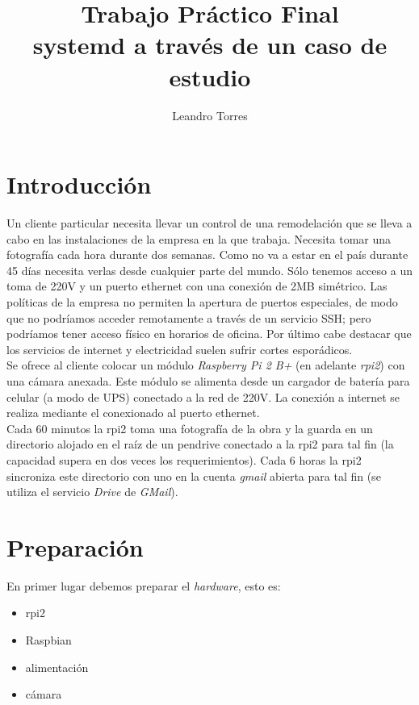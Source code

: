 \documentclass[10pt,a4paper]{article}
\author{Leandro Torres}
\title{\Huge{Trabajo Pr\'actico Final}\\
	\vspace{5cm}
	\huge{systemd a trav\'es de un caso de estudio}}
\begin{document}
\maketitle
\pagebreak
\tableofcontents

\section{Introducci\'on}

Un cliente particular necesita llevar un control de una remodelaci\'on que se lleva a cabo en las instalaciones de la empresa en la que trabaja. Necesita tomar una fotograf\'ia cada hora durante dos semanas. Como no va a estar en el pa\'is durante 45 d\'ias necesita verlas desde cualquier parte del mundo. S\'olo tenemos acceso a un toma de 220V y un puerto ethernet con una conexi\'on de 2MB sim\'etrico. Las pol\'iticas de la empresa no permiten la apertura de puertos especiales, de modo que no podr\'iamos acceder remotamente a trav\'es de un servicio SSH; pero podr\'iamos tener acceso f\'isico en horarios de oficina. Por \'ultimo cabe destacar que los servicios de internet y electricidad suelen sufrir cortes espor\'adicos.\\

Se ofrece al cliente colocar un m\'odulo \emph{Raspberry Pi 2 B+} (en adelante \emph{rpi2}) con una c\'amara anexada. Este m\'odulo se alimenta desde un cargador de bater\'ia para celular (a modo de UPS) conectado a la red de 220V. La conexi\'on a internet se realiza mediante el conexionado al puerto ethernet.\\

Cada 60 minutos la rpi2 toma una fotograf\'ia de la obra y la guarda en un directorio alojado en el ra\'iz de un pendrive conectado a la rpi2 para tal fin (la capacidad supera en dos veces los requerimientos). Cada 6 horas la rpi2 sincroniza este directorio con uno en la cuenta \emph{gmail} abierta para tal fin (se utiliza el servicio \emph{Drive} de \emph{GMail}).

\section{Preparaci\'on}

En primer lugar debemos preparar el \emph{hardware}, esto es:
\begin{itemize}
    \item rpi2
    \item Raspbian
    \item alimentaci\'on
    \item c\'amara
\end{itemize}
\end{document}
